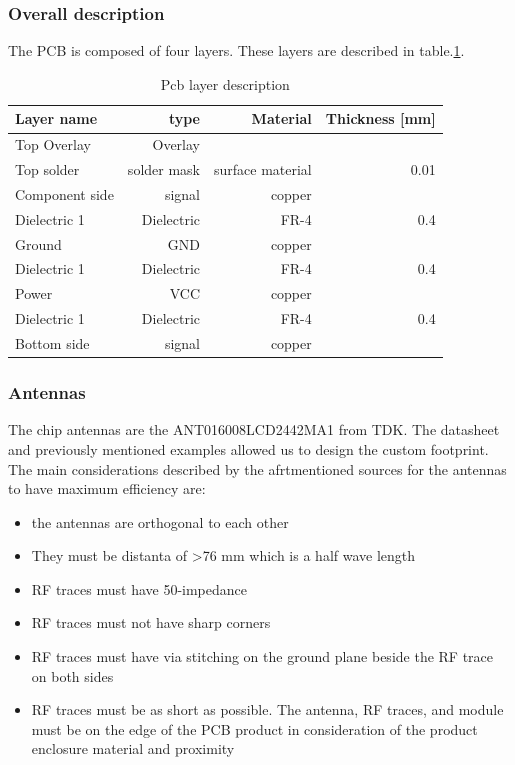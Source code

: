 \subsubsection{Overall description}
The PCB is composed of four layers. These layers are described in table.\ref{tab:layer description}.
\begin{table}[!htbp]
  \begin{center}
    \begin{tabular}{|l|r|r|r|}%
      \hline
        Layer name & type & Material & Thickness [mm] \\ \hline \hline
        Top Overlay & Overlay & & \\ \hline
        Top solder & solder mask & surface material & 0.01 \\ \hline
        Component side & signal & copper &  \\ \hline
        Dielectric 1 & Dielectric & FR-4 & 0.4 \\ \hline
        Ground & GND & copper &\\ \hline
        Dielectric 1 & Dielectric & FR-4 & 0.4 \\ \hline
        Power & VCC & copper & \\ \hline
        Dielectric 1 & Dielectric & FR-4 & 0.4 \\ \hline
        Bottom side & signal & copper &\\ \hline
         \hline
    \end{tabular}
  \end{center}
  \caption {Pcb layer description} \label{tab:layer description}
\end{table}


\subsubsection{Antennas}
The chip antennas are the ANT016008LCD2442MA1 from TDK. The datasheet and previously mentioned examples allowed us to design the custom footprint.
The main considerations described by the afrtmentioned sources for the antennas to have maximum efficiency are:

\begin{itemize}
  \item {the antennas are orthogonal to each other}
  \item {They must be distanta of >76 mm which is a half wave length}
  \item {RF traces must have 50-\textOmega impedance}
  \item {RF traces must not have sharp corners}
  \item {RF traces must have via stitching on the ground plane beside the RF trace on both sides}
  \item {RF traces must be as short as possible. The antenna, RF traces, and module must be on the edge of the PCB product in consideration of the product enclosure material and proximity}
\end{itemize}

